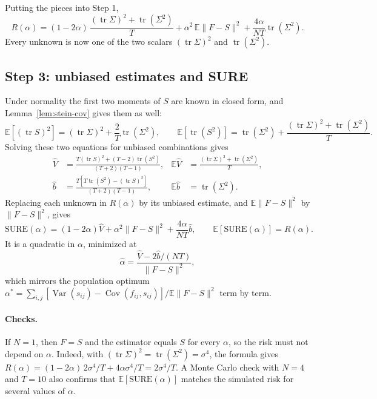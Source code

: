 Putting the pieces into Step 1,
\[
  R(\alpha) = (1 - 2\alpha)\, \frac{(\operatorname{tr}\Sigma)^2 + \operatorname{tr}(\Sigma^2)}{T} + \alpha^2\, \mathbb{E}\|F - S\|^2 + \frac{4\alpha}{NT}\operatorname{tr}(\Sigma^2).
\]
Every unknown is now one of the two scalars $(\operatorname{tr}\Sigma)^2$ and $\operatorname{tr}(\Sigma^2)$.

\subsection{Step 3: unbiased estimates and SURE}

Under normality the first two moments of $S$ are known in closed form, and Lemma~\ref{lem:stein-cov} gives them as well:
\[
  \mathbb{E}\left[ (\operatorname{tr}S)^2 \right] = (\operatorname{tr}\Sigma)^2 + \frac{2}{T}\operatorname{tr}(\Sigma^2),
  \qquad
  \mathbb{E}\left[ \operatorname{tr}(S^2) \right] = \operatorname{tr}(\Sigma^2) + \frac{(\operatorname{tr}\Sigma)^2 + \operatorname{tr}(\Sigma^2)}{T}.
\]
Solving these two equations for unbiased combinations gives
\begin{align*}
  \hat V &= \frac{T(\operatorname{tr}S)^2 + (T-2)\operatorname{tr}(S^2)}{(T+2)(T-1)},
  & \mathbb{E}\hat V &= \frac{(\operatorname{tr}\Sigma)^2 + \operatorname{tr}(\Sigma^2)}{T}, \\
  \hat b &= \frac{T\left[ T\operatorname{tr}(S^2) - (\operatorname{tr}S)^2 \right]}{(T+2)(T-1)},
  & \mathbb{E}\hat b &= \operatorname{tr}(\Sigma^2).
\end{align*}
Replacing each unknown in $R(\alpha)$ by its unbiased estimate, and $\mathbb{E}\|F - S\|^2$ by $\|F - S\|^2$, gives
\[
  \mathrm{SURE}(\alpha) = (1 - 2\alpha)\hat V + \alpha^2 \|F - S\|^2 + \frac{4\alpha}{NT}\hat b,
  \qquad \mathbb{E}[\mathrm{SURE}(\alpha)] = R(\alpha).
\]
It is a quadratic in $\alpha$, minimized at
\[
  \hat\alpha = \frac{\hat V - 2\hat b/(NT)}{\|F - S\|^2},
\]
which mirrors the population optimum $\alpha^* = \sum_{i,j}[\operatorname{Var}(s_{ij}) - \operatorname{Cov}(f_{ij}, s_{ij})] / \mathbb{E}\|F - S\|^2$ term by term.

\paragraph{Checks.}
If $N = 1$, then $F = S$ and the estimator equals $S$ for every $\alpha$, so the risk must not depend on $\alpha$. Indeed, with $(\operatorname{tr}\Sigma)^2 = \operatorname{tr}(\Sigma^2) = \sigma^4$, the formula gives $R(\alpha) = (1 - 2\alpha)\, 2\sigma^4/T + 4\alpha\sigma^4/T = 2\sigma^4/T$. A Monte Carlo check with $N = 4$ and $T = 10$ also confirms that $\mathbb{E}[\mathrm{SURE}(\alpha)]$ matches the simulated risk for several values of $\alpha$.

